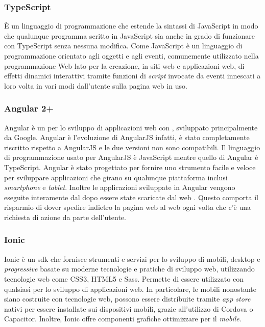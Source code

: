 \subsubsection*{TypeScript}
È un linguaggio di programmazione  che estende la sintassi di JavaScript in modo che qualunque programma scritto in JavaScript sia anche in grado di funzionare con TypeScript senza nessuna modifica. Come JavaScript è un linguaggio di programmazione orientato agli oggetti e agli eventi, comunemente utilizzato nella programmazione Web lato  per la creazione, in siti web e applicazioni web, di effetti dinamici interattivi tramite funzioni di \emph{script} invocate da eventi innescati a loro volta in vari modi dall'utente sulla pagina web in uso.

\subsubsection*{Angular 2+}
Angular è un   per lo sviluppo di applicazioni web con , sviluppato principalmente da Google. Angular è l'evoluzione di AngularJS infatti, è stato completamente riscritto rispetto a AngularJS e le due versioni non sono compatibili. Il linguaggio di programmazione usato per AngularJS è JavaScript mentre quello di Angular è TypeScript. Angular è stato progettato per fornire uno strumento facile e veloce per sviluppare applicazioni che girano su qualunque piattaforma inclusi \emph{smartphone} e \emph{tablet}. Inoltre le applicazioni sviluppate in Angular vengono eseguite interamente dal  dopo essere state scaricate dal web . Questo comporta il risparmio di dover spedire indietro la pagina web al web  ogni volta che c'è una richiesta di azione da parte dell'utente. 

\subsubsection*{Ionic}
Ionic è un \gls{sdk}  che fornisce strumenti e servizi per lo sviluppo di \textcolor{SchoolColor}{\ap{[g]}} mobili, desktop e \emph{progressive} basate su moderne tecnologie e pratiche di sviluppo web, utilizzando tecnologie web come \gls{CSS}3, \gls{HTML}5 e \gls{Sass}. Permette di essere utilizzato con qualsiasi  per lo sviluppo di applicazioni web. In particolare, le \textcolor{SchoolColor}{\ap{[g]}} mobili nonostante siano costruite con tecnologie web, possono essere distribuite tramite \emph{app store} nativi per essere installate sui dispositivi mobili, grazie all'utilizzo di  Cordova o Capacitor. Inoltre, Ionic offre componenti grafiche ottimizzare per il \emph{mobile}.

